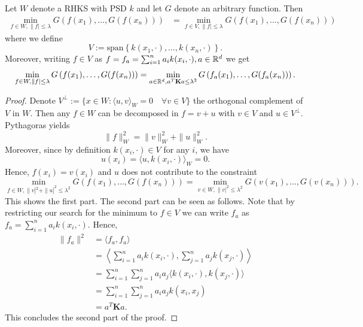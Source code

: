 \begin{theorem}\label{theo:representer}
Let $W$ denote a RHKS with PSD $k$ and let $G$ denote an arbitrary function. Then
\begin{align*}
	\min_{f\in W, \|f|\leq \lambda} G\left(f(x_1), \ldots, G(f(x_n))\right) &= \min_{f\in V, \|f|\leq \lambda} G\left(f(x_1), \ldots, G(f(x_n))\right) 
\end{align*}
where we define
\begin{equation*}
	V := \mathrm{span}\left\{k(x_1, \cdot), \ldots, k(x_n, \cdot)\right\}.
\end{equation*}
Moreover, writing $f \in V$ as $f = f_a = \sum_{i=1}^n a_i k(x_i, \cdot), a \in \mathbb{R}^d$ we get
\begin{equation*}
	\min_{f\in W, \|f|\leq \lambda} G\left(f(x_1), \ldots, G(f(x_n))\right) = \min_{a\in \mathbb{R}^d, a^T\mathbf{K}a \leq \lambda^2} G\left(f_a(x_1), \ldots, G(f_a(x_n))\right).
\end{equation*}
\end{theorem}
\begin{proof}
Denote $V^\perp := \{x \in W : \langle u, v \rangle_W = 0 \quad \forall v \in V\}$ the orthogonal complement of $V$ in $W$. Then any $f\in W$ can be decomposed in $f = v + u$ with $v \in V$ and $u\in V^\perp$. Pythagoras yields
\begin{equation*}
	\|f\|_W^2 = \|v\|_W^2 + \|u\|_W^2.
\end{equation*}
Moreover, since by definition $k(x_i, \cdot) \in V$ for any $i$, we have
\begin{equation*}
	u(x_i) = \langle u, k(x_i, \cdot) \rangle_W = 0.
\end{equation*}
Hence, $f(x_i) = v(x_i)$ and $u$ does not contribute to the constraint
\begin{equation*}
	\min_{f\in W, \|v|^2+\|u|^2\leq \lambda^2} G\left(f(x_1), \ldots, G(f(x_n))\right) = \min_{v\in W, \|v|^2\leq \lambda^2} G\left(v(x_1), \ldots, G(v(x_n))\right).
\end{equation*}
This shows the first part. The second part can be seen as follows. Note that by restricting our search for the minimum to $f \in V$ we can write $f_a$ as $f_a = \sum_{i=1}^n a_i k(x_i, \cdot)$. Hence, 
\begin{align*}
	\|f_a\|^2 &= \langle f_a, f_a \rangle \\
						&= \left\langle \sum_{i=1}^n a_i k(x_i, \cdot),\sum_{j=1}^n a_j k(x_j, \cdot)\right\rangle \\
						&= \sum_{i=1}^n\sum_{j=1}^n a_i a_j \langle k(x_i, \cdot),k(x_j, \cdot) \rangle \\
						&= \sum_{i=1}^n\sum_{j=1}^n a_i a_j k(x_i,x_j) \\
						&= a^T\mathbf{K}a.
\end{align*}
This concludes the second part of the proof.
\end{proof}


